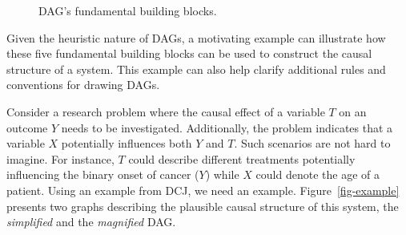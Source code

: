 \documentclass[
  authoryear,
  preprint,
  1p]{elsarticle}
\begin{document}
\begin{figure}
\begin{minipage}{0.33\linewidth}
{}


\end{minipage}%
%
\begin{minipage}{0.33\linewidth}



\end{minipage}%

\caption{\label{fig-dags}DAG's fundamental building blocks.}

\end{figure}%

Given the heuristic nature of DAGs, a motivating example can illustrate
how these five fundamental building blocks can be used to construct the
causal structure of a system. This example can also help clarify
additional rules and conventions for drawing DAGs.

Consider a research problem where the causal effect of a variable \(T\)
on an outcome \(Y\) needs to be investigated. Additionally, the problem
indicates that a variable \(X\) potentially influences both \(Y\) and
\(T\). Such scenarios are not hard to imagine. For instance, \(T\) could
describe different treatments potentially influencing the binary onset
of cancer (\(Y\)) while \(X\) could denote the age of a patient. Using
an example from DCJ, {we need an example}. Figure~\ref{fig-example}
presents two graphs describing the plausible causal structure of this
system, the \emph{simplified} and the \emph{magnified} DAG.
\end{document}

